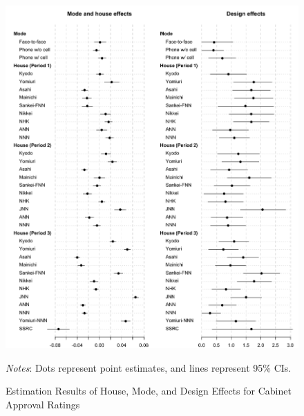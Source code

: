 \documentclass[12pt,letterpaper]{scrartcl}
\begin{document}
\begin{figure}[p]
\begin{minipage}{\hsize}
\centering
\singlespacing
\includegraphics[scale=1]{Figure_POQ/miscellaneous_cabinet_approval.pdf}
\caption{Estimation Results of House, Mode, and Design Effects for Cabinet Approval Ratings}
\label{house_mode_design_cabinet}
\end{minipage}
\begin{minipage}{\hsize}
\singlespacing
\small
\emph{Notes}: Dots represent point estimates, and lines represent 95\% CIs.
\end{minipage}
\end{figure}
\end{document}
